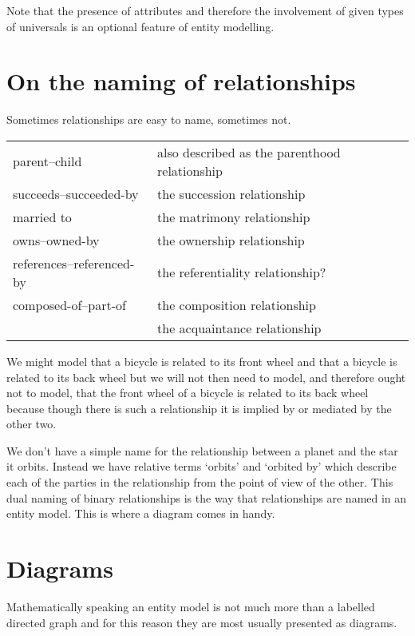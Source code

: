 \mynote
Note that the presence of attributes and therefore the involvement of given types of universals
is an optional feature of entity modelling. 

\section{On the naming of relationships}

\mynote Sometimes relationships are easy to name, sometimes not. 

\begin{center}
\begin{tabular} {| l | p{9cm} |}
\hline
parent--child & also described as the parenthood relationship\\
succeeds--succeeded-by &  the succession relationship \\
married to             &  the matrimony relationship \\
owns--owned-by         & the ownership relationship\\
references--referenced-by & the referentiality relationship?\\
composed-of--part-of   &  the composition relationship\\
                       &  the acquaintance relationship\\
\hline
\end{tabular} 
\end{center}

\mynote We might model that a bicycle is related to its front wheel and that a bicycle is related to its back wheel but we will not then need to model,  and therefore ought not to model, that the front wheel of a bicycle is related to its back wheel because though there is such a relationship it is implied by or mediated by the other two.  

\mynote 
We don't have a simple name for the relationship between a planet and the star it orbits. Instead we have  relative terms `orbits' and `orbited by' which describe each of the parties in the relationship from the point of view of the other. This dual naming of binary relationships is the way that relationships are named in an entity model. 
This is where a diagram comes in handy.

\section{Diagrams}
  
\mynote Mathematically speaking an entity model is not much more than a labelled directed graph and for this reason they are most usually presented as diagrams.

